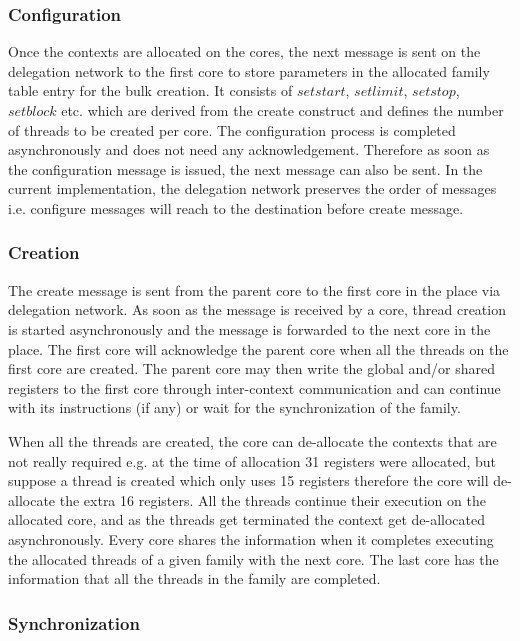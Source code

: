 \documentclass{article}
\begin{document}
\subsubsection*{Configuration}

Once the contexts are allocated on the cores, the next message is sent on the
delegation network to the first core to store parameters in the allocated
family table entry for the bulk creation. It consists of $setstart$,
$setlimit$, $setstop$, $setblock$ etc. which are derived from the create
construct and defines the number of threads to be created per core. The
configuration process is completed asynchronously and does not need any
acknowledgement. Therefore as soon as the configuration message is issued,
the next message can also be sent. In the current implementation, the
delegation network preserves the order of messages i.e. configure messages will
reach to the destination before create message.

\subsubsection*{Creation}

The create message is sent from the parent core to the first core in the place
via delegation network. As soon as the message is received by a core, thread
creation is started asynchronously and the message is forwarded to the next
core in the place. The first core will acknowledge the parent core when all the
threads on the first core are created. The parent core may then write the
global and/or shared registers to the first core through inter-context
communication and can continue with its instructions (if any) or wait for the
synchronization of the family.

When all the threads are created, the core can de-allocate the contexts that
are not really required e.g. at the time of allocation 31 registers were
allocated, but suppose a thread is created which only uses 15 registers
therefore the core will de-allocate the extra 16 registers. All the threads
continue their execution on the allocated core, and as the threads get
terminated the context get de-allocated asynchronously. Every core shares the
information when it completes executing the allocated threads of a given family
with the next core. The last core has the information that all the threads in
the family are completed.

\subsubsection*{Synchronization}
\end{document}
